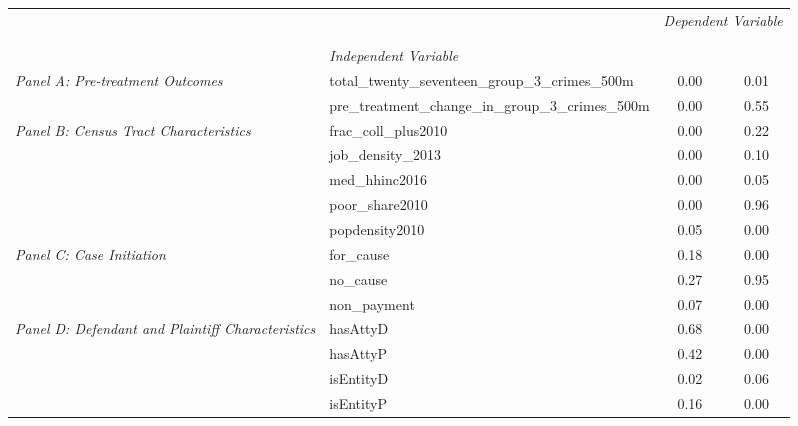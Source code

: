 \begin{tabular}{llcc}
\toprule
 &  & \multicolumn{2}{c}{\textit{Dependent Variable}} \\
\cline{3-4}
\\
 &  &  &  \\
 & \emph{Independent Variable} &  &  \\
\midrule
\multirow[c]{2}{3cm}{\textit{Panel A: Pre-treatment Outcomes}} & total_twenty_seventeen_group_3_crimes_500m & 0.00 & 0.01 \\
 & pre_treatment_change_in_group_3_crimes_500m & 0.00 & 0.55 \\
\cline{1-4}
\multirow[c]{5}{3cm}{\textit{Panel B: Census Tract Characteristics}} & frac_coll_plus2010 & 0.00 & 0.22 \\
 & job_density_2013 & 0.00 & 0.10 \\
 & med_hhinc2016 & 0.00 & 0.05 \\
 & poor_share2010 & 0.00 & 0.96 \\
 & popdensity2010 & 0.05 & 0.00 \\
\cline{1-4}
\multirow[c]{3}{3cm}{\textit{Panel C: Case Initiation}} & for_cause & 0.18 & 0.00 \\
 & no_cause & 0.27 & 0.95 \\
 & non_payment & 0.07 & 0.00 \\
\cline{1-4}
\multirow[c]{4}{3cm}{\textit{Panel D: Defendant and Plaintiff Characteristics}} & hasAttyD & 0.68 & 0.00 \\
 & hasAttyP & 0.42 & 0.00 \\
 & isEntityD & 0.02 & 0.06 \\
 & isEntityP & 0.16 & 0.00 \\
\cline{1-4}
\bottomrule
\end{tabular}
